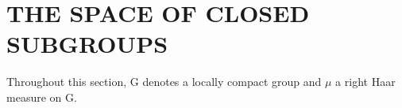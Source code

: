 \section{THE SPACE OF CLOSED SUBGROUPS}

Throughout this section, G denotes a locally compact group and \(\mu\) a right Haar measure on G.

